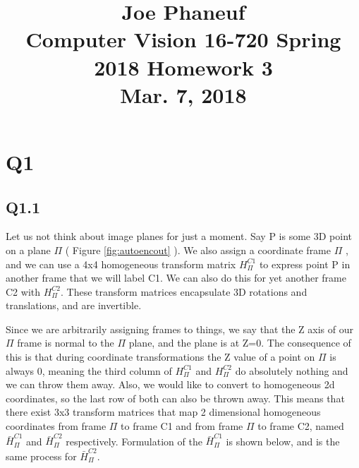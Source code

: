 \documentclass[12pt]{article}
\begin{document}
\title{Joe Phaneuf \\ Computer Vision 16-720 Spring 2018 Homework 3 \\ Mar. 7, 2018 }
\date{}
\author{}
\maketitle

\newpage


\section{Q1}
\subsection{Q1.1}
Let us not think about image planes for just a moment. Say P is some 3D point on a plane $\Pi$ ( Figure \ref{fig:autoencout} ). We also assign a coordinate frame $\Pi$ , and we can use a 4x4 homogeneous transform matrix $H_{\Pi}^{C1}$ to express point P in another frame that we will label C1. We can also do this for yet another frame C2 with $H_{\Pi}^{C2}$. These transform matrices encapsulate 3D rotations and translations, and are invertible. 

Since we are arbitrarily assigning frames to things, we say that the Z axis of our $\Pi$ frame is normal to the $\Pi$ plane, and the plane is at Z=0. The consequence of this is that during coordinate transformations the Z value of a point on $\Pi$ is always 0, meaning the third column of $H_{\Pi}^{C1}$ and $H_{\Pi}^{C2}$ do absolutely nothing and we can throw them away. Also, we would like to convert to homogeneous 2d coordinates, so the last row of both can also be thrown away. This means that there exist 3x3 transform matrices that map 2 dimensional homogeneous coordinates from frame $\Pi$ to frame C1 and from frame $\Pi$ to frame C2, named $\bar{H}_{\Pi}^{C1}$ and $\bar{H}_{\Pi}^{C2}$ respectively. Formulation of the $\bar{H}_{\Pi}^{C1}$ is shown below, and is the same process for $\bar{H}_{\Pi}^{C2}$.
\end{document}
